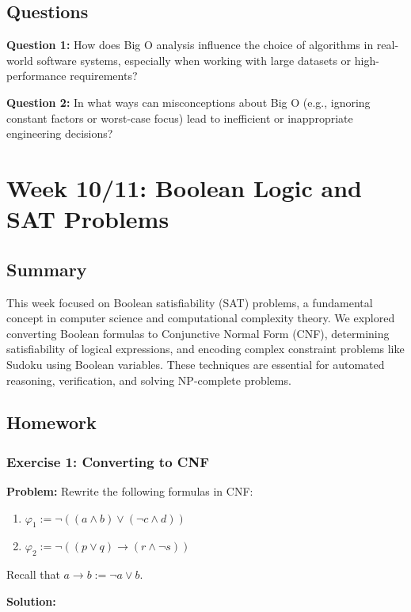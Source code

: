\documentclass{article}
\begin{document}
\subsection{Questions}

\textbf{Question 1:} How does Big O analysis influence the choice of algorithms in real-world software systems, especially when working with large datasets or high-performance requirements?

\textbf{Question 2:} In what ways can misconceptions about Big O (e.g., ignoring constant factors or worst-case focus) lead to inefficient or inappropriate engineering decisions?


\section{Week 10/11: Boolean Logic and SAT Problems}

\subsection{Summary}
This week focused on Boolean satisfiability (SAT) problems, a fundamental concept in computer science and computational complexity theory. We explored converting Boolean formulas to Conjunctive Normal Form (CNF), determining satisfiability of logical expressions, and encoding complex constraint problems like Sudoku using Boolean variables. These techniques are essential for automated reasoning, verification, and solving NP-complete problems.

\subsection{Homework}

\subsubsection{Exercise 1: Converting to CNF}

\textbf{Problem:} Rewrite the following formulas in CNF:
\begin{enumerate}
    \item $\varphi_1 := \neg((a \land b) \lor (\neg c \land d))$
    \item $\varphi_2 := \neg((p \lor q) \to (r \land \neg s))$
\end{enumerate}

Recall that $a \to b := \neg a \lor b$.

\textbf{Solution:}
\end{document}
